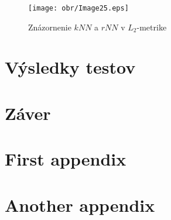 \documentclass[12pt,oneside]{fithesis2}
\begin{document}
	\begin{figure}
  		\centering
  		\texttt{[image: obr/Image25.eps]}
  		\caption{Znázornenie $kNN$ a $rNN$ v $L_2$-metrike}
  		\label{fig:triangle}
	\end{figure}  
   
   
   
    \chapter{Výsledky testov}
    
    \chapter{Záver}

    \chapter{First appendix}        %

    \chapter{Another appendix}

\end{document}
